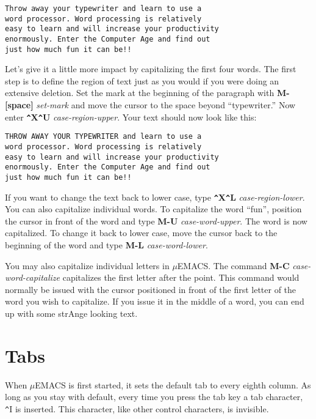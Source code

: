 \begin{verbatim}
Throw away your typewriter and learn to use a
word processor. Word processing is relatively
easy to learn and will increase your productivity
enormously. Enter the Computer Age and find out
just how much fun it can be!!
\end{verbatim}

Let's give it a little more impact by capitalizing the first four
words. The first step is to define the region of text just as you would
if you were doing an extensive deletion. Set the mark at the beginning
of the paragraph with {\bf M-[space]} {\it set-mark} and move the
cursor to the space beyond ``typewriter.'' Now enter {\bf
\verb+^+X\verb+^+U} {\it case-region-upper}. Your text should now look
like this:

\begin{verbatim}
THROW AWAY YOUR TYPEWRITER and learn to use a
word processor. Word processing is relatively
easy to learn and will increase your productivity
enormously. Enter the Computer Age and find out
just how much fun it can be!!
\end{verbatim}

If you want to change the text back to lower case, type {\bf
\verb+^+X\verb+^+L} {\it case-region-lower}. You can also capitalize
individual words. To capitalize the word ``fun'', position the cursor
in front of the word and type {\bf M-U} {\it case-word-upper}. The word
is now capitalized. To change it back to lower case, move the cursor
back to the beginning of the word and type {\bf M-L} {\it
case-word-lower}.

You may also capitalize individual letters in $\mu$EMACS. The command
{\bf M-C} {\it case-word-capitalize} capitalizes the first letter after
the point. This command would normally be issued with the cursor
positioned in front of the first letter of the word you wish to
capitalize. If you issue it in the middle of a word, you can end up
with some strAnge looking text.
\section{Tabs}

When $\mu$EMACS is first started, it sets the default tab to every
eighth column. As long as you stay with default, every time you press
the tab key a tab character, \verb+^+I is inserted. This character,
like other control characters, is invisible.

